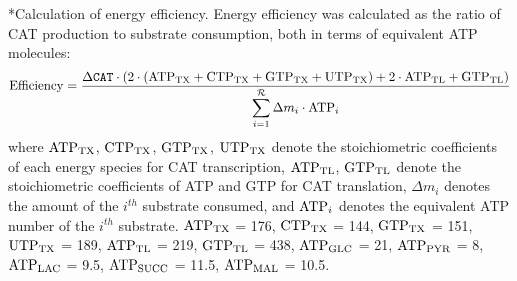 \documentclass[12pt]{article}
\makeatletter
\renewcommand\subsection{\@startsection
	{subsection}{2}{0mm}
	{-0.05in}
	{-0.5\baselineskip}
	{\normalfont\normalsize\bfseries}}
\makeatother
\begin{document}
\subsection*{Calculation of energy efficiency.}
Energy efficiency was calculated as the ratio of CAT production to substrate consumption, both in terms of equivalent ATP molecules:
\begin{equation}\label{eqn:energy-efficiency-definition}
	{\rm Efficiency}=\frac{\Delta\texttt{CAT}\cdot \left(2\cdot\left(\rm {ATP}_{TX}+\rm {CTP}_{TX}+\rm {GTP}_{TX}+\rm {UTP}_{TX}\right)+\rm2\cdot\rm {ATP}_{TL}+\rm {GTP}_{TL}\right)}{\displaystyle\sum_{i=1}^{\mathcal{R}}\Delta m_{i}\cdot {\rm ATP}_i}
\end{equation}
where $\rm {ATP}_{TX}$, $\rm {CTP}_{TX}$, $\rm {GTP}_{TX}$, $\rm {UTP}_{TX}$ denote the stoichiometric coefficients of each energy species for CAT transcription, $\rm {ATP}_{TL}$, $\rm {GTP}_{TL}$ denote the stoichiometric coefficients of ATP and GTP for CAT translation, $\Delta m_{i}$ denotes the amount of the $i^{th}$ substrate consumed, and ${\rm ATP}_i$ denotes the equivalent ATP number of the $i^{th}$ substrate.
$\rm {ATP}_{TX}$ = 176, $\rm {CTP}_{TX}$ = 144, $\rm {GTP}_{TX}$ = 151, $\rm {UTP}_{TX}$ = 189, $\rm {ATP}_{TL}$ = 219, $\rm {GTP}_{TL}$ = 438, $\rm {ATP}_{GLC}$ = 21, $\rm {ATP}_{PYR}$ = 8, $\rm {ATP}_{LAC}$ = 9.5, $\rm {ATP}_{SUCC}$ = 11.5, $\rm {ATP}_{MAL}$ = 10.5.

\clearpage
\end{document}
